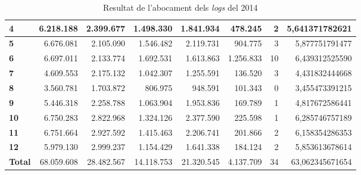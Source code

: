\begin{table}[h!]
\begin{adjustbox}{width=1.5\textwidth, center}
\begin{tabular}{|l|r|r|r|r|r|r|r|}
            \textbf{4}     & 6.218.188  & 2.399.677  & 1.498.330  & 1.841.934  & 478.245   & 2  & 5,641371782621  \\
            \midrule
            \textbf{5}     & 6.676.081  & 2.105.090  & 1.546.482  & 2.119.731  & 904.775   & 3  & 5,877751791477  \\
            \textbf{6}     & 6.697.011  & 2.133.774  & 1.692.531  & 1.613.863  & 1.256.833 & 10 & 6,439312525590  \\
            \textbf{7}     & 4.609.553  & 2.175.132  & 1.042.307  & 1.255.591  & 136.520   & 3  & 4,431832444668  \\
            \textbf{8}     & 3.560.781  & 1.703.872  & 806.975    & 948.591    & 101.343   & 0  & 3,455473391215  \\
            \midrule
            \textbf{9}     & 5.446.318  & 2.258.788  & 1.063.904  & 1.953.836  & 169.789   & 1  & 4,817672586441  \\
            \textbf{10}    & 6.750.283  & 2.822.968  & 1.324.126  & 2.377.590  & 225.598   & 1  & 6,285746757189  \\
            \textbf{11}    & 6.751.664  & 2.927.592  & 1.415.463  & 2.206.741  & 201.866   & 2  & 6,158354286353  \\
            \textbf{12}    & 5.979.130  & 2.999.237  & 1.154.429  & 1.641.338  & 184.124   & 2  & 5,853613678614  \\
            \midrule
            \textbf{Total} & 68.059.608 & 28.482.567 & 14.118.753 & 21.320.545 & 4.137.709 & 34 & 63,062345671654 \\
            \bottomrule
        \end{tabular}
    \end{adjustbox}
    \caption{Resultat de l'abocament dels \textit{logs} del 2014}
    \label{tab:logs-table-2014}
\end{table}
